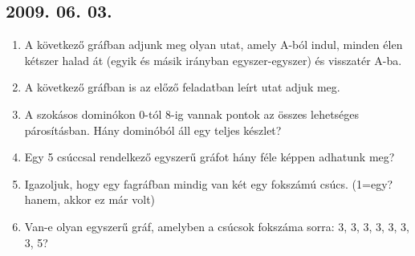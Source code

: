 \documentclass{article}
\begin{document}
\subsection*{2009. 06. 03.}
\begin{enumerate}
\item A következő gráfban adjunk meg olyan utat, amely A-ból indul, minden élen kétszer halad át (egyik és másik irányban egyszer-egyszer) és visszatér A-ba.
\item A következő gráfban is az előző feladatban leírt utat adjuk meg.
\item A szokásos dominókon 0-tól 8-ig vannak pontok az összes lehetséges párosításban. Hány dominóból áll egy teljes készlet?
\item Egy 5 csúccsal rendelkező egyszerű gráfot hány féle képpen adhatunk meg?
\item Igazoljuk, hogy egy fagráfban mindig van két egy fokszámú csúcs. (1=egy? hanem, akkor ez már volt)
\item Van-e olyan egyszerű gráf, amelyben a csúcsok fokszáma sorra: 3, 3, 3, 3, 3, 3, 3, 5?


\end{enumerate}
\end{document}
